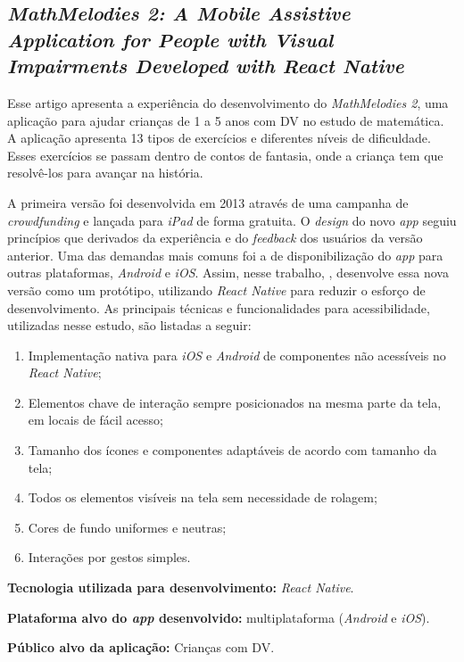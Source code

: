 \subsection{\emph{MathMelodies 2: A Mobile Assistive Application for People with Visual Impairments Developed with React Native}}

Esse artigo apresenta a experiência do desenvolvimento do \emph{MathMelodies 2}, uma aplicação para ajudar crianças de 1 a 5 anos com DV no estudo de matemática.
A aplicação apresenta 13 tipos de exercícios e diferentes níveis de dificuldade.
Esses exercícios se passam dentro de contos de fantasia, onde a criança tem que resolvê-los para avançar na história.

A primeira versão foi desenvolvida em 2013 através de uma campanha de \emph{crowdfunding} e lançada para \emph{iPad} de forma gratuita.
O \emph{design} do novo \emph{app} seguiu princípios que derivados da experiência e do \emph{feedback} dos usuários da versão anterior.
Uma das demandas mais comuns foi a de disponibilização do \emph{app} para outras plataformas, \emph{Android} e \emph{iOS}.
Assim, nesse trabalho, , desenvolve essa nova versão como um protótipo, utilizando \emph{React Native} para reduzir o esforço de desenvolvimento.
As principais técnicas e funcionalidades para acessibilidade, utilizadas nesse estudo, são listadas a seguir:

\begin{enumerate}
    \item Implementação nativa para \emph{iOS} e \emph{Android} de componentes não acessíveis no \emph{React Native};
    \item Elementos chave de interação sempre posicionados na mesma parte da tela, em locais de fácil acesso;
    \item Tamanho dos ícones e componentes adaptáveis de acordo com tamanho da tela;
    \item Todos os elementos visíveis na tela sem necessidade de rolagem;
    \item Cores de fundo uniformes e neutras;
    \item Interações por gestos simples.
\end{enumerate}

\textbf{Tecnologia utilizada para desenvolvimento:} \emph{React Native}.

\textbf{Plataforma alvo do \emph{app} desenvolvido:} multiplataforma (\emph{Android} e \emph{iOS}).

\textbf{Público alvo da aplicação:} Crianças com DV\@.

